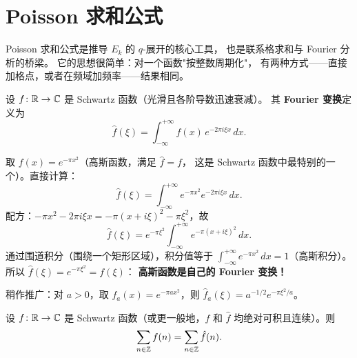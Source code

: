 \section{Poisson 求和公式}
\label{sec:poisson-summation}

Poisson 求和公式是推导 $E_k$ 的 $q$-展开的核心工具，
也是联系格求和与 Fourier 分析的桥梁。
它的思想很简单：对一个函数"按整数周期化"，
有两种方式——直接加格点，或者在频域加频率——结果相同。

\begin{definition}[Fourier 变换]
\label{def:fourier-transform}
设 $f\colon \mathbb{R} \to \mathbb{C}$ 是 Schwartz 函数（光滑且各阶导数迅速衰减）。
其 \textbf{Fourier 变换}定义为
\[
  \hat{f}(\xi) = \int_{-\infty}^{+\infty} f(x)\, e^{-2\pi i \xi x}\, dx.
\]
\end{definition}

\begin{example}
\label{ex:gaussian-fourier}
取 $f(x) = e^{-\pi x^2}$（高斯函数，满足 $\hat{f} = f$，
这是 Schwartz 函数中最特别的一个）。直接计算：
\[
  \hat{f}(\xi)
  = \int_{-\infty}^{+\infty} e^{-\pi x^2} e^{-2\pi i \xi x}\, dx.
\]
配方：$-\pi x^2 - 2\pi i \xi x = -\pi(x + i\xi)^2 - \pi\xi^2$，故
\[
  \hat{f}(\xi) = e^{-\pi \xi^2} \int_{-\infty}^{+\infty} e^{-\pi(x+i\xi)^2}\, dx.
\]
通过围道积分（围绕一个矩形区域），积分值等于
$\int_{-\infty}^{+\infty} e^{-\pi x^2}\, dx = 1$（高斯积分）。
所以 $\hat{f}(\xi) = e^{-\pi\xi^2} = f(\xi)$：
\textbf{高斯函数是自己的 Fourier 变换！}

稍作推广：对 $a > 0$，取 $f_a(x) = e^{-\pi a x^2}$，则
$\hat{f}_a(\xi) = a^{-1/2} e^{-\pi \xi^2/a}$。
\end{example}

\begin{theorem}
\label{thm:poisson-summation}
设 $f\colon \mathbb{R} \to \mathbb{C}$ 是 Schwartz 函数（或更一般地，$f$ 和 $\hat{f}$ 均绝对可积且连续）。则
\[
  \sum_{n \in \mathbb{Z}} f(n) = \sum_{n \in \mathbb{Z}} \hat{f}(n).
\]
\end{theorem}



